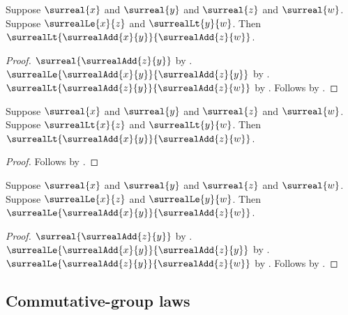 \begin{corollary}\label{surreal_add_le_lt}
    Suppose $\surreal{x}$ and $\surreal{y}$ and
        $\surreal{z}$ and $\surreal{w}$.
    Suppose $\surrealLe{x}{z}$ and $\surrealLt{y}{w}$.
    Then $\surrealLt{\surrealAdd{x}{y}}{\surrealAdd{z}{w}}$.
\end{corollary}
\begin{proof}
    $\surreal{\surrealAdd{z}{y}}$
        by .
    $\surrealLe{\surrealAdd{x}{y}}{\surrealAdd{z}{y}}$
        by .
    $\surrealLt{\surrealAdd{z}{y}}{\surrealAdd{z}{w}}$
        by .
    Follows by .
\end{proof}

\begin{corollary}\label{surreal_add_lt_both}
    Suppose $\surreal{x}$ and $\surreal{y}$ and
        $\surreal{z}$ and $\surreal{w}$.
    Suppose $\surrealLt{x}{z}$ and $\surrealLt{y}{w}$.
    Then $\surrealLt{\surrealAdd{x}{y}}{\surrealAdd{z}{w}}$.
\end{corollary}
\begin{proof}
    Follows by .
\end{proof}

\begin{corollary}\label{surreal_add_le_both}
    Suppose $\surreal{x}$ and $\surreal{y}$ and
        $\surreal{z}$ and $\surreal{w}$.
    Suppose $\surrealLe{x}{z}$ and $\surrealLe{y}{w}$.
    Then $\surrealLe{\surrealAdd{x}{y}}{\surrealAdd{z}{w}}$.
\end{corollary}
\begin{proof}
    $\surreal{\surrealAdd{z}{y}}$
        by .
    $\surrealLe{\surrealAdd{x}{y}}{\surrealAdd{z}{y}}$
        by .
    $\surrealLe{\surrealAdd{z}{y}}{\surrealAdd{z}{w}}$
        by .
    Follows by .
\end{proof}

\subsection{Commutative-group laws}

